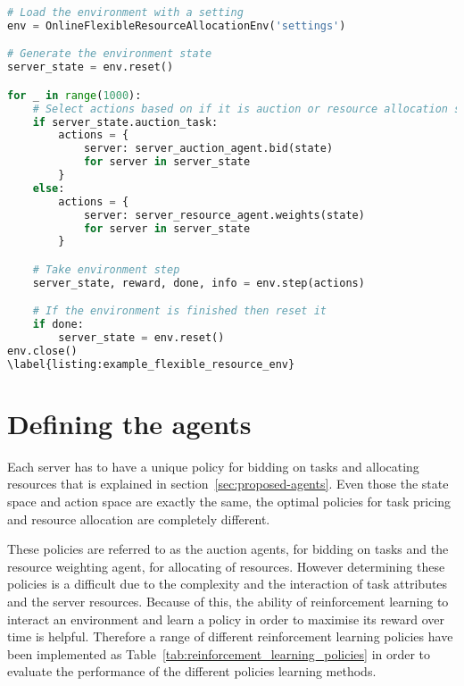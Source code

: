 \begin{lstlisting}[language=Python, frame=single, caption={An example for running the environment},captionpos=b]
# Load the environment with a setting
env = OnlineFlexibleResourceAllocationEnv('settings')

# Generate the environment state
server_state = env.reset()

for _ in range(1000):
    # Select actions based on if it is auction or resource allocation step
    if server_state.auction_task:
        actions = {
            server: server_auction_agent.bid(state)
            for server in server_state
        }
    else:
        actions = {
            server: server_resource_agent.weights(state)
            for server in server_state
        }

    # Take environment step
    server_state, reward, done, info = env.step(actions)

    # If the environment is finished then reset it
    if done:
        server_state = env.reset()
env.close()
\label{listing:example_flexible_resource_env}
\end{lstlisting}

\section{Defining the agents}\label{sec:agent-definition}
Each server has to have a unique policy for bidding on tasks and allocating resources that is explained in
section~\ref{sec:proposed-agents}. Even those the state space and action space are exactly the same, the optimal
policies for task pricing and resource allocation are completely different.

These policies are referred to as the auction agents, for bidding on tasks and the resource weighting agent,
for allocating of resources. However determining these policies is a difficult due to the complexity and the interaction
of task attributes and the server resources. Because of this, the ability of reinforcement learning to interact
an environment and learn a policy in order to maximise its reward over time is helpful. Therefore a range of different
reinforcement learning policies have been implemented as Table~\ref{tab:reinforcement_learning_policies} in order to
evaluate the performance of the different policies learning methods.

